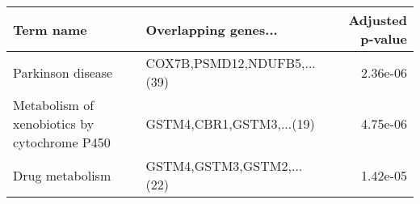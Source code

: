 \begin{tabular}{llr}
\toprule
                                   Term name &        Overlapping genes... &  Adjusted p-value \\
\midrule
                           Parkinson disease & COX7B,PSMD12,NDUFB5,...(39) &          2.36e-06 \\
Metabolism of xenobiotics by cytochrome P450 &    GSTM4,CBR1,GSTM3,...(19) &          4.75e-06 \\
                             Drug metabolism &   GSTM4,GSTM3,GSTM2,...(22) &          1.42e-05 \\
\bottomrule
\end{tabular}
